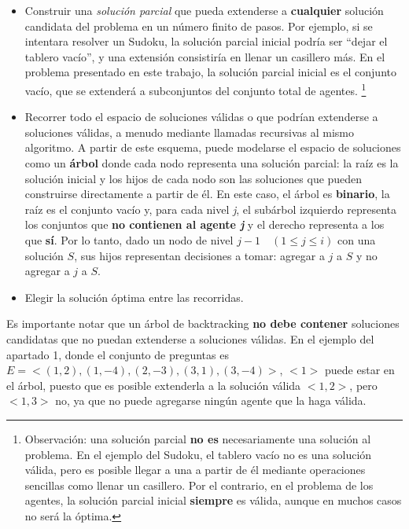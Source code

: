 \documentclass[10pt, a4paper]{article}
\begin{document}
		\begin{itemize}
		\item Construir una \textit{soluci\'on parcial} que pueda extenderse a \textbf{cualquier} soluci\'on candidata del problema en un n\'umero finito de pasos. Por ejemplo, si se intentara resolver un Sudoku, la soluci\'on parcial inicial podr\'ia ser ``dejar el tablero vac\'io'', y una extensi\'on consistir\'ia en llenar un casillero m\'as. En el problema presentado en este trabajo, la soluci\'on parcial inicial es el conjunto vac\'io, que se extender\'a a subconjuntos del conjunto total de agentes. \footnote{Observaci\'on: una soluci\'on parcial \textbf{no es} necesariamente una soluci\'on al problema. En el ejemplo del Sudoku, el tablero vac\'io no es una soluci\'on v\'alida, pero es posible llegar a una a partir de \'el mediante operaciones sencillas como llenar un casillero. Por el contrario, en el problema de los agentes, la soluci\'on parcial inicial \textbf{siempre} es v\'alida, aunque en muchos casos no ser\'a la \'optima.}
		\item Recorrer todo el espacio de soluciones v\'alidas o que podr\'ian extenderse a soluciones v\'alidas, a menudo mediante llamadas recursivas al mismo algoritmo. A partir de este esquema, puede modelarse el espacio de soluciones como un \textbf{\'arbol} donde cada nodo representa una soluci\'on parcial: la ra\'iz es la soluci\'on inicial y los hijos de cada nodo son las soluciones que pueden construirse directamente a partir de \'el. En este caso, el \'arbol es \textbf{binario}, la ra\'iz es el conjunto vac\'io y, para cada nivel \textit{j}, el sub\'arbol izquierdo representa los conjuntos que \textbf{no contienen al agente \textit{j}} y el derecho representa a los que \textbf{s\'i}. Por lo tanto, dado un nodo de nivel $j-1 \quad (1 \leq j \leq i)$ con una soluci\'on $S$, sus hijos representan decisiones a tomar: agregar a $j$ a $S$ y no agregar a $j$ a $S$.
		\item Elegir la soluci\'on \'optima entre las recorridas.
		\end{itemize}
		
		Es importante notar que un \'arbol de backtracking \textbf{no debe contener} soluciones candidatas que no puedan extenderse a soluciones v\'alidas. En el ejemplo del apartado 1, donde el conjunto de preguntas es $E = <(1,2), (1,-4), (2,-3), (3,1), (3,-4)>$, $<1>$ puede estar en el \'arbol, puesto que es posible extenderla a la soluci\'on v\'alida $<1, 2>$, pero $<1, 3>$ no, ya que no puede agregarse ning\'un agente que la haga v\'alida.
		
\end{document}
